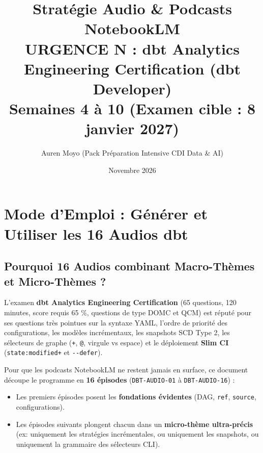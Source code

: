 \documentclass[11pt,a4paper]{article}
\title{\textbf{Stratégie Audio \& Podcasts NotebookLM}\\
\Large URGENCE N\textdegree 1 : dbt Analytics Engineering Certification (dbt Developer)\\
\large Semaines 4 à 10 (Examen cible : 8 janvier 2027)}
\author{Auren Moyo (Pack Préparation Intensive CDI Data \& AI)}
\date{Novembre 2026}
\newcommand{\flag}[1]{\texttt{-{}-#1}}
\begin{document}
\maketitle
\tableofcontents
\newpage

\section{Mode d'Emploi : Générer et Utiliser les 16 Audios dbt}

\subsection{Pourquoi 16 Audios combinant Macro-Thèmes et Micro-Thèmes ?}
L'examen \textbf{dbt Analytics Engineering Certification} (65 questions, 120 minutes, score requis 65 \%, questions de type DOMC et QCM) est réputé pour ses questions très pointues sur la syntaxe YAML, l'ordre de priorité des configurations, les modèles incrémentaux, les snapshots SCD Type 2, les sélecteurs de graphe (\texttt{+}, \texttt{@}, virgule vs espace) et le déploiement \textbf{Slim CI} (\texttt{state:modified+} et \flag{defer}).

Pour que les podcasts NotebookLM ne restent jamais en surface, ce document découpe le programme en \textbf{16 épisodes} (\texttt{DBT-AUDIO-01} à \texttt{DBT-AUDIO-16}) :
\begin{itemize}
    \item Les premiers épisodes posent les \textbf{fondations évidentes} (DAG, \texttt{ref}, \texttt{source}, configurations).
    \item Les épisodes suivants plongent chacun dans un \textbf{micro-thème ultra-précis} (ex: uniquement les stratégies incrémentales, ou uniquement les snapshots, ou uniquement la grammaire des sélecteurs CLI).
\end{itemize}
\end{document}
